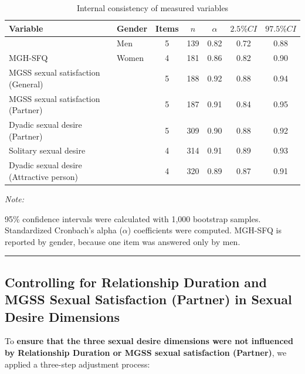 \documentclass[
  bookmarksnumbered]{article}
\begin{document}
\begin{table}[H]
\centering
\caption{\label{tab:Cronbach-tab}Internal consistency of measured variables}
\centering
\begin{threeparttable}
\begin{tabular}[t]{llccccc}
\toprule
Variable & Gender & Items & $n$ & $\alpha$ & $2.5\% CI$ & $97.5\% CI$\\
\midrule
 & Men & 5 & 139 & 0.82 & 0.72 & 0.88\\
\cmidrule{2-7}
\multirow{-2}{*}{\raggedright\arraybackslash MGH-SFQ} & Women & 4 & 181 & 0.86 & 0.82 & 0.90\\
\cmidrule{1-7}
MGSS sexual satisfaction (General) &  & 5 & 188 & 0.92 & 0.88 & 0.94\\
\cmidrule{1-7}
MGSS sexual satisfaction (Partner) &  & 5 & 187 & 0.91 & 0.84 & 0.95\\
\cmidrule{1-7}
Dyadic sexual desire (Partner) &  & 5 & 309 & 0.90 & 0.88 & 0.92\\
\cmidrule{1-7}
Solitary sexual desire &  & 4 & 314 & 0.91 & 0.89 & 0.93\\
\cmidrule{1-7}
Dyadic sexual desire (Attractive person) &  & 4 & 320 & 0.89 & 0.87 & 0.91\\
\bottomrule
\end{tabular}
\begin{tablenotes}[para]
\item \textit{Note: } 
\item 95\% confidence intervals were calculated with 1,000 bootstrap samples.
           Standardized Cronbach's alpha ($\alpha$) coefficients were computed.
           MGH-SFQ is reported by gender, because one item was answered only by men.
\end{tablenotes}
\end{threeparttable}
\end{table}

\begin{center}\rule{0.5\linewidth}{0.5pt}\end{center}

\subsection{Controlling for Relationship Duration and MGSS Sexual Satisfaction (Partner) in Sexual Desire Dimensions}\label{controlling-for-relationship-duration-and-mgss-sexual-satisfaction-partner-in-sexual-desire-dimensions}

To \textbf{ensure that the three sexual desire dimensions were not influenced by Relationship Duration or MGSS sexual satisfaction (Partner)}, we applied a three-step adjustment process:
\end{document}
